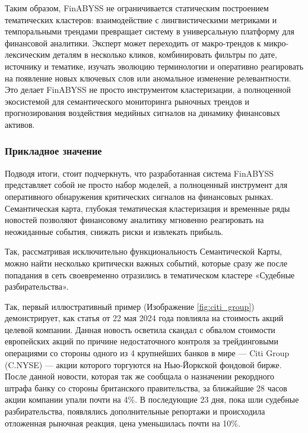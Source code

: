 Таким образом, FinABYSS не ограничивается статическим построением тематических кластеров:
взаимодействие с лингвистическими метриками и темпоральными трендами превращает систему
в универсальную платформу для финансовой аналитики. Эксперт может переходить от макро-трендов
к микро-лексическим деталям в несколько кликов, комбинировать фильтры по дате, источнику и тематике,
изучать эволюцию терминологии и оперативно реагировать на появление новых ключевых слов или аномальное
изменение релевантности. Это делает FinABYSS не просто инструментом кластеризации, а полноценной экосистемой
для семантического мониторинга рыночных трендов и прогнозирования воздействия медийных сигналов на динамику финансовых
активов.

\subsubsection{Прикладное значение}
\label{sec:practical_importance}

Подводя итоги, стоит подчеркнуть, что разработанная система FinABYSS представляет собой не просто набор моделей,
а полноценный инструмент для оперативного обнаружения критических сигналов на финансовых рынках. Семантическая
карта, глубокая тематическая кластеризация и временные ряды новостей позволяют финансовому аналитику мгновенно
реагировать на неожиданные события, снижать риски и извлекать прибыль.

Так, рассматривая исключительно функциональность Семантической Карты, можно найти несколько критически важных
событий, которые сразу же после попадания в сеть своевременно отразились в тематическом кластере «Судебные
разбирательства».

Так, первый иллюстративный пример (Изображение \ref{fig:citi_group}) демонстрирует, как статья от 22 мая 2024 года
повлияла на стоимость акций целевой компании. Данная новость осветила скандал с обвалом стоимости европейских акций
по причине недостаточного контроля за трейдинговыми операциями со стороны одного из 4 крупнейших банков в мире ---
Citi Group (C.NYSE) — акции которого торгуются на Нью-Йоркской фондовой бирже. После данной новости, которая так же
сообщала о назначении рекордного штрафа банку со стороны британского правительства, за ближайшие 28 часов акции компании
упали почти на 4\%. В последующие 23 дня, пока шли судебные разбирательства, появлялись дополнительные репортажи
и происходила отложенная рыночная реакция, цена уменьшилась почти на 10\%.

